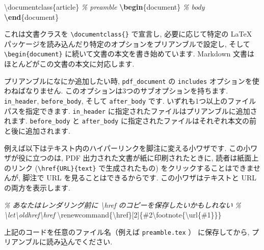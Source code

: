 \documentclass[
  11pt,
  lualatex,ja=standard,jafont=noto]{bxjsreport}
\newenvironment{Shaded}{\begin{snugshade}}{\end{snugshade}}
\newcommand{\BuiltInTok}[1]{#1}
\newcommand{\CommentTok}[1]{\textcolor[rgb]{0.56,0.35,0.01}{\textit{#1}}}
\newcommand{\ExtensionTok}[1]{#1}
\newcommand{\FunctionTok}[1]{\textcolor[rgb]{0.00,0.00,0.00}{#1}}
\newcommand{\KeywordTok}[1]{\textcolor[rgb]{0.13,0.29,0.53}{\textbf{#1}}}
\newcommand{\NormalTok}[1]{#1}
\begin{document}
\begin{Shaded}
\begin{Highlighting}[]
\BuiltInTok{\textbackslash{}documentclass}\NormalTok{\{}\ExtensionTok{article}\NormalTok{\}}
\CommentTok{\% preamble}
\KeywordTok{\textbackslash{}begin}\NormalTok{\{}\ExtensionTok{document}\NormalTok{\}}
\CommentTok{\% body}
\KeywordTok{\textbackslash{}end}\NormalTok{\{}\ExtensionTok{document}\NormalTok{\}}
\end{Highlighting}
\end{Shaded}

これは文書クラスを \texttt{\textbackslash{}documentclass\{\}} で宣言し, 必要に応じて特定の LaTeX パッケージを読み込んだり特定のオプションをプリアンブルで設定し, そして \texttt{\textbackslash{}begin\{document\}} に続いて文書の本文を書き始めています. Markdown 文書はほとんどがこの文書の本文に対応します.

プリアンブルになにか追加したい時, \texttt{pdf\_document} の \texttt{includes} オプションを使わねばなりません. このオプションは3つのサブオプションを持ちます. \texttt{in\_header}, \texttt{before\_body}, そして \texttt{after\_body} です. いずれも1つ以上のファイルパスを指定できます. \texttt{in\_header} に指定されたファイルはプリアンブルに追加されます. \texttt{before\_body} と \texttt{after\_body} に指定されたファイルはそれぞれ本文の前と後に追加されます.

例えば以下はテキスト内のハイパーリンクを脚注に変える小ワザです. この小ワザが役に立つのは, PDF 出力された文書が紙に印刷されたときに, 読者は紙面上のリンク (\texttt{\textbackslash{}href\{URL\}\{text\}} で生成されたもの) をクリックすることはできませんが, 脚注で URL を見ることはできるからです. この小ワザはテキストと URL の両方を表示します.

\begin{Shaded}
\begin{Highlighting}[]
\CommentTok{\% あなたはレンダリング前に \textbackslash{}href のコピーを保存したいかもしれない}
\CommentTok{\% \textbackslash{}let\textbackslash{}oldhref\textbackslash{}href}
\FunctionTok{\textbackslash{}renewcommand}\NormalTok{\{}\ExtensionTok{\textbackslash{}href}\NormalTok{\}[2]\{\#2}\FunctionTok{\textbackslash{}footnote}\NormalTok{\{}\FunctionTok{\textbackslash{}url}\NormalTok{\{\#1\}\}\}}
\end{Highlighting}
\end{Shaded}

上記のコードを任意のファイル名（例えば \texttt{preamble.tex} ） に保存してから, プリアンブルに読み込んでください.
\end{document}
